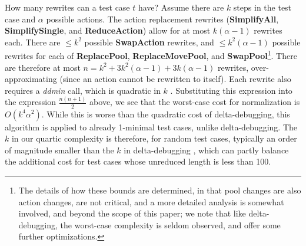 How many rewrites can a test case $t$ have?  Assume there are $k$
steps in the test case and $\alpha$ possible actions.  The action
replacement rewrites ({\bf SimplifyAll}, {\bf SimplifySingle}, and
{\bf ReduceAction}) allow for at most $k (\alpha-1)$ rewrites each.  There
are $\leq k^2$ possible {\bf SwapAction} rewrites, and $\leq k^2(\alpha-1)$
possible rewrites for each of {\bf ReplacePool}, {\bf
  ReplaceMovePool}, and {\bf SwapPool}\footnote{The details of how
  these bounds are determined, in that pool changes are also action
  changes, are not critical, and a more detailed analysis is somewhat
  involved, and beyond the scope of this paper; we note that like
  delta-debugging, the worst-case complexity is seldom observed, and
  offer some further optimizations.}.  There are therefore at
most $n=k^2 + 3k^2(\alpha-1) + 3k(\alpha-1)$ rewrites, over-approximating (since
an action cannot be rewritten to itself).  Each rewrite also
requires a \emph{ddmin} call, which is quadratic in $k$ \cite{DD}.
Substituting this expression into the expression $\frac{n(n+1)}{2}$
above, we see that the worst-case cost for normalization is
$O(k^4\alpha^2)$.  While this is
worse than the quadratic cost of delta-debugging, this algorithm is
applied to already 1-minimal test cases, unlike delta-debugging. The $k$ in our quartic complexity
is therefore, for random test cases, typically an order of magnitude smaller
than the $k$ in delta-debugging \cite{ICSEDiff,icst2014,MinUnit},
which can partly balance the additional cost for test cases whose
unreduced length is less than 100.


